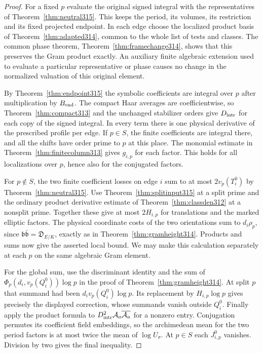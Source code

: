 \documentclass[a4paper,11pt]{article}
\theoremstyle{definition}
\theoremstyle{remark}
\numberwithin{equation}{section}
\begin{document}
\begin{proof}
For a fixed \(p\) evaluate the original signed integral with the
representatives of Theorem~\ref{thm:neutral315}. This keeps the
period, its volumes, its restriction and its fixed projected
endpoint. In each edge choose the localized product basis of
Theorem~\ref{thm:adapted314}, common to the whole list of tests
and classes. The common phase theorem,
Theorem~\ref{thm:framechange314}, shows that this preserves the
Gram product exactly. An auxiliary finite algebraic extension used
to evaluate a particular representative or phase causes no change
in the normalized valuation of this original element.

By Theorem~\ref{thm:endpoint315} the symbolic coefficients are
integral over \(p\) after multiplication by \(B_{\rm end}\).
The compact Haar averages are coefficientwise, so
Theorem~\ref{thm:compact313} and the unchanged stabilizer orders
give \(D_{\rm intr}\) for each copy of the signed integral.
In every term there is one physical derivative of the prescribed
profile per edge. If \(p\in S\), the finite coefficients are
integral there, and all the shifts have order prime to \(p\)
at this place. The monomial estimate in
Theorem~\ref{thm:finitecolumn313} gives \(g_{i,p}\) for each
factor. This holds for all localizations over \(p\), hence also
for the conjugated factors.

For \(p\notin S\), the two finite coefficient losses on edge
\(i\) sum to at most \(2v_p(T_i^0)\) by
Theorem~\ref{thm:neutral315}. Use Theorem~\ref{thm:splitinput315}
at a split prime and the ordinary product derivative estimate
of Theorem~\ref{thm:classden312} at a nonsplit prime. Together
these give at most \(2H_{i,p}\) for translations and the marked
elliptic factors. The physical coordinate costs of the two
orientations sum to \(d_i\rho_p\), since
\(\mathfrak b\bar{\mathfrak b}=\mathfrak D_{E/K}\), exactly as
in Theorem~\ref{thm:gramheight314}. Products and sums now give
the asserted local bound. We may make this calculation separately
at each \(p\) on the same algebraic Gram element.

For the global sum, use the discriminant identity and the sum of
\(\Phi_p(d_i,v_p(Q_i^0))\log p\) in the proof of
Theorem~\ref{thm:gramheight314}. At split \(p\) that summand
had been \(d_i v_p(Q_i^0)\log p\). Its replacement by
\(H_{i,p}\log p\) gives precisely the displayed correction,
whose summands vanish outside \(Q_i^0\). Finally apply the
product formula to \(D_{\rm intr}^2\mathcal A_a
\overline{\mathcal A_a}\) for a nonzero entry. Conjugation
permutes its coefficient field embeddings, so the archimedean
mean for the two period factors is at most twice the mean of
\(\log U_\sigma\). At \(p\in S\) each \(J^0_{i,p}\) vanishes.
Division by two gives the final inequality.
\end{proof}
\end{document}
